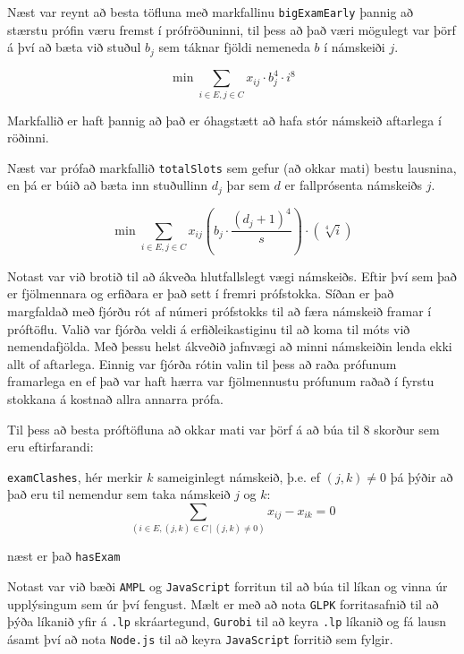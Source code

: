 \documentclass[12pt]{article}
\begin{document}
Næst var reynt að besta töfluna með markfallinu \texttt{bigExamEarly} þannig að stærstu prófin væru fremst í prófröðuninni, til þess að það væri mögulegt var þörf á því að bæta við stuðul $b_{j}$ sem táknar fjöldi nemeneda $ b $ í námskeiði $ j $.

$$\min \sum_{i \in E, j \in C} x_{ij} \cdot b^{4}_j \cdot i^8$$

Markfallið er haft þannig að það er óhagstætt að hafa stór námskeið aftarlega í röðinni.

\medskip
Næst var prófað markfallið \texttt{totalSlots} sem gefur (að okkar mati) bestu lausnina, en þá er búið að bæta inn stuðullinn $ d_{j} $ þar sem $ d $ er fallprósenta námskeiðs $ j $.



$$\min \sum_{i \in E, j \in C} x_{ij} \left(b_j \cdot \dfrac{(d_j + 1)^4}{s} \right) \cdot \left( \sqrt[4]{i} \right)$$

Notast var við brotið til að ákveða hlutfallslegt vægi námskeiðs. Eftir því sem það er fjölmennara og erfiðara er það sett í fremri prófstokka. Síðan er það margfaldað með fjórðu rót af númeri prófstokks til að færa námskeið framar í próftöflu. Valið var fjórða veldi á erfiðleikastiginu til að koma til móts við nemendafjölda. Með þessu helst ákveðið jafnvægi að minni námskeiðin lenda ekki allt of aftarlega. Einnig var fjórða rótin valin til þess að raða prófunum framarlega en ef það var haft hærra var fjölmennustu prófunum raðað í fyrstu stokkana á kostnað allra annarra prófa.

\medskip

Til þess að besta próftöfluna að okkar mati var þörf á að búa til 8 skorður sem eru eftirfarandi:

\texttt{examClashes}, hér merkir $ k $ sameiginlegt námskeið, þ.e. ef $ (j,k) \neq 0 $ þá þýðir að það eru til nemendur sem taka námskeið $ j $ og $ k $:
$$\sum_{(i \in E, (j,k)\in C ~| ~(j,k) \neq 0)} x_{ij} - x_{ik} = 0$$

næst er það \texttt{hasExam}

\newpage

Notast var við bæði \texttt{AMPL} og \texttt{JavaScript} forritun til að búa til líkan og vinna úr upplýsingum sem úr því fengust. Mælt er með að nota \texttt{GLPK} forritasafnið til að þýða líkanið yfir á \texttt{.lp} skráartegund, \texttt{Gurobi} til að keyra \texttt{.lp} líkanið og fá lausn ásamt því að nota \texttt{Node.js} til að keyra \texttt{JavaScript} forritið sem fylgir.

\medskip
\end{document}
